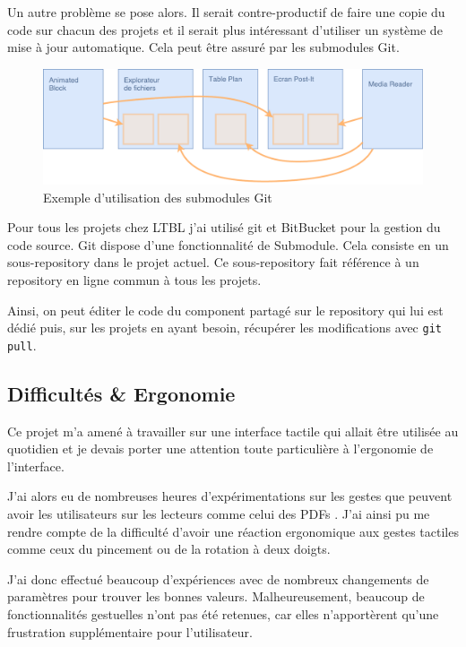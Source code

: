 Un autre problème se pose alors.
Il serait contre-productif de faire une copie du code sur chacun des projets et il serait plus intéressant d'utiliser un système de mise à jour automatique.
Cela peut être assuré par les submodules Git.

\begin{figure}[h]
    \centering
    \includegraphics[scale=0.5]{img/submodules.pdf}
    \caption{Exemple d'utilisation des submodules Git}
\end{figure}

Pour tous les projets chez LTBL j'ai utilisé git et BitBucket pour la gestion du code source.
Git dispose d'une fonctionnalité de Submodule.
Cela consiste en un sous-repository dans le projet actuel.
Ce sous-repository fait référence à un repository en ligne commun à tous les projets.

Ainsi, on peut éditer le code du component partagé sur le repository qui lui est dédié puis, sur les projets en ayant besoin, récupérer les modifications avec \texttt{git pull}.

\subsection{Difficultés \& Ergonomie}

Ce projet m'a amené à travailler sur une interface tactile qui allait être utilisée au quotidien et je devais porter une attention toute particulière à l'ergonomie de l'interface.

J'ai alors eu de nombreuses heures d'expérimentations sur les gestes que peuvent avoir les utilisateurs sur les lecteurs comme celui des PDFs .
J'ai ainsi pu me rendre compte de la difficulté d'avoir une réaction ergonomique aux gestes tactiles comme ceux du pincement ou de la rotation à deux doigts.

J'ai donc effectué beaucoup d'expériences avec de nombreux changements de paramètres pour trouver les bonnes valeurs.
Malheureusement, beaucoup de fonctionnalités gestuelles n'ont pas été retenues, car elles n'apportèrent qu'une frustration supplémentaire pour l'utilisateur.

